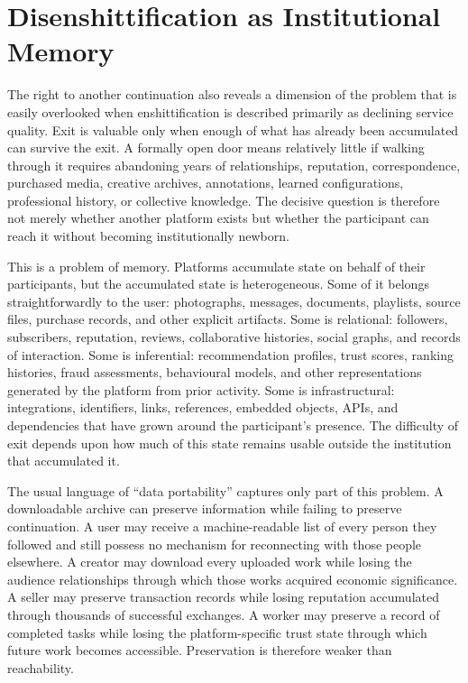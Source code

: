 \documentclass[11pt]{article}
\begin{document}
\section{Disenshittification as Institutional Memory}

The right to another continuation also reveals a dimension of the problem that is easily overlooked when enshittification is described primarily as declining service quality. Exit is valuable only when enough of what has already been accumulated can survive the exit. A formally open door means relatively little if walking through it requires abandoning years of relationships, reputation, correspondence, purchased media, creative archives, annotations, learned configurations, professional history, or collective knowledge. The decisive question is therefore not merely whether another platform exists but whether the participant can reach it without becoming institutionally newborn.

This is a problem of memory. Platforms accumulate state on behalf of their participants, but the accumulated state is heterogeneous. Some of it belongs straightforwardly to the user: photographs, messages, documents, playlists, source files, purchase records, and other explicit artifacts. Some is relational: followers, subscribers, reputation, reviews, collaborative histories, social graphs, and records of interaction. Some is inferential: recommendation profiles, trust scores, ranking histories, fraud assessments, behavioural models, and other representations generated by the platform from prior activity. Some is infrastructural: integrations, identifiers, links, references, embedded objects, APIs, and dependencies that have grown around the participant's presence. The difficulty of exit depends upon how much of this state remains usable outside the institution that accumulated it.

The usual language of ``data portability'' captures only part of this problem. A downloadable archive can preserve information while failing to preserve continuation. A user may receive a machine-readable list of every person they followed and still possess no mechanism for reconnecting with those people elsewhere. A creator may download every uploaded work while losing the audience relationships through which those works acquired economic significance. A seller may preserve transaction records while losing reputation accumulated through thousands of successful exchanges. A worker may preserve a record of completed tasks while losing the platform-specific trust state through which future work becomes accessible. Preservation is therefore weaker than reachability.
\end{document}
